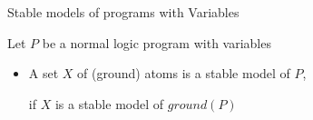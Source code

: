 \begin{frame}{Stable models of programs with Variables}

  \bigskip

  Let $P$ be a normal logic program with variables

  \bigskip
  \begin{itemize}
  \item<2->
  A set $X$ of (\alert{ground}) atoms is a \alert{stable model} of $P$,
  \par\medskip
  if $X$ is a stable model of \alert{$\mathit{ground}(P)$}
  \end{itemize}

\end{frame}
%
